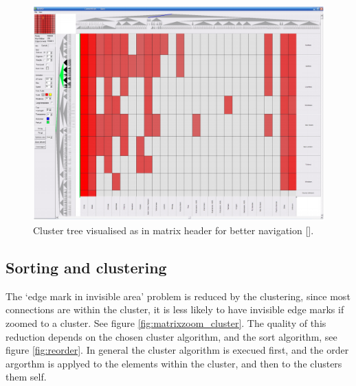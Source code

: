 \begin{figure}[h]
\centering
\includegraphics[width=\textwidth]{images/matrixzoom_abello}
\caption{Cluster tree visualised as in matrix header for better navigation [\cite{abello2004}]. \label{fig:matrixzoom_abello}}
\end{figure}





\subsection{Sorting and clustering}   

The ‘edge mark in invisible area' problem is reduced by the clustering, since most connections are within the cluster, it is less likely to have invisible edge marks if zoomed to a cluster. See figure \ref{fig:matrixzoom_cluster}. 
The quality of this reduction depends on the chosen cluster algorithm, and the sort algorithm, see figure \ref{fig:reorder}. In general the cluster algorithm is execued first, and the order argorthm is applyed to the elements within the cluster, and then to the clusters them self.

